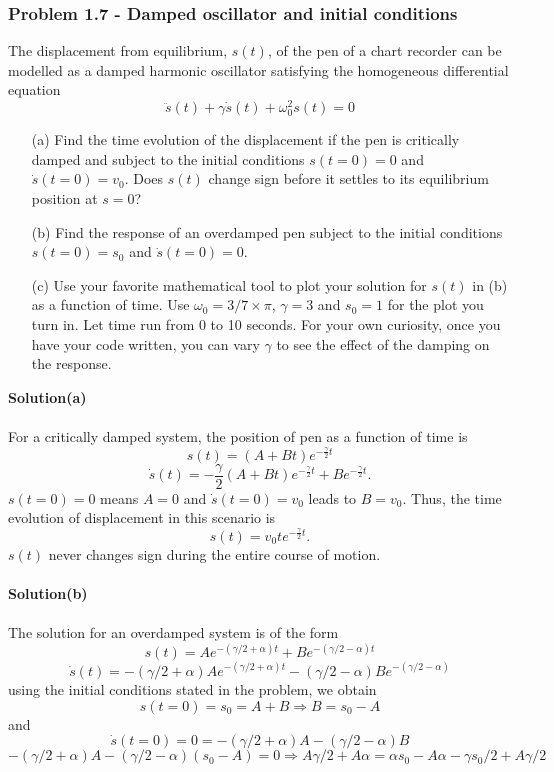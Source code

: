 \documentclass[12pt,a4paper]{article}
\begin{document}
\subsubsection*{Problem 1.7 - Damped oscillator and initial conditions}
The displacement from equilibrium, $s(t)$, of the pen of a chart recorder can be modelled as a damped harmonic oscillator satisfying the homogeneous differential equation
\[\ddot{s}(t)+\gamma\dot{s}(t)+\omega_0^2s(t)=0\]
\begin{enumerate}
    \item[(a)]Find the time evolution of the displacement if the pen is critically damped and subject to the initial conditions $s(t=0)=0$ and $\dot{s}(t=0)=v_0$. Does $s(t)$ change sign before it settles to its equilibrium position at $s=0$?
    \item[(b)]Find the response of an overdamped pen subject to the initial conditions $s(t=0)=s_0$ and $\dot{s}(t=0)=0$.
    \item[(c)]Use your favorite mathematical tool to plot your solution for $s(t)$ in (b) as a function of time. Use $\omega_0=3/7\times\pi$, $\gamma=3$ and $s_0=1$ for the plot you turn in. Let time run from 0 to 10 seconds. For your own curiosity, once you have your code written, you can vary $\gamma$ to see the effect of the damping on the response.
\end{enumerate}
\textbf{Solution(a)}
\\
\\For a critically damped system, the position of pen as a function of time is
\[s(t)=(A+Bt)e^{-\frac{\gamma}{2}t}\]
\[\dot{s}(t)=-\frac{\gamma}{2}(A+Bt)e^{-\frac{\gamma}{2}t}+Be^{-\frac{\gamma}{2}t}.\]
$s(t=0)=0$ means $A=0$ and $\dot{s}(t=0)=v_0$ leads to $B=v_0$. Thus, the time evolution of displacement in this scenario is
\[s(t)=v_0te^{-\frac{\gamma}{2}t}.\]
$s(t)$ never changes sign during the entire course of motion.
\\
\\\textbf{Solution(b)}
\\
\\The solution for an overdamped system is of the form
\[s(t)=Ae^{-\left(\gamma/2+\alpha\right)t}+Be^{-\left(\gamma/2-\alpha\right)t}\]
\[\dot{s}(t)=-\left(\gamma/2+\alpha\right)Ae^{-\left(\gamma/2+\alpha\right)t}-\left(\gamma/2-\alpha\right)Be^{-\left(\gamma/2-\alpha\right)}\]
using the initial conditions stated in the problem, we obtain
\[s(t=0)=s_0=A+B\Rightarrow B=s_0-A\]
and
\[\dot{s}(t=0)=0=-\left(\gamma/2+\alpha\right)A-\left(\gamma/2-\alpha\right)B\]
\[-\left(\gamma/2+\alpha\right)A-\left(\gamma/2-\alpha\right)(s_0-A)=0\Rightarrow A\gamma/2+A\alpha=\alpha s_0-A\alpha-\gamma s_0/2+A\gamma/2\]
\end{document}

